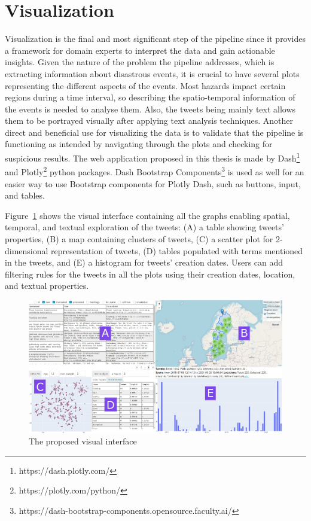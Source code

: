 \section{Visualization} 

Visualization is the final and most significant step of the pipeline since it provides a framework
for domain experts to interpret the data and gain actionable insights. Given the nature of the
problem the pipeline addresses, which is extracting information about disastrous events, it is
crucial to have several plots representing the different aspects of the events. Most hazards impact
certain regions during a time interval, so describing the spatio-temporal information of the events
is needed to analyse them. Also, the tweets being mainly text allows them to be portrayed visually
after applying text analysis techniques. Another direct and beneficial use for visualizing the data
is to validate that the pipeline is functioning as intended by navigating through the plots and
checking for suspicious results. The web application proposed in this thesis is made by
Dash\footnote{https://dash.plotly.com/} and Plotly\footnote{https://plotly.com/python/} python
packages. Dash Bootstrap
Components\footnote{https://dash-bootstrap-components.opensource.faculty.ai/} is used as well for an
easier way to use Bootstrap components for Plotly Dash, such as buttons, input, and tables.

Figure~\ref{fig:visual_interface} shows the visual interface containing all the graphs enabling
spatial, temporal, and textual exploration of the tweets: (A) a table showing tweets' properties,
(B) a map containing clusters of tweets, (C) a scatter plot for 2-dimensional representation of
tweets, (D) tables populated with terms mentioned in the tweets, and (E) a histogram for tweets'
creation dates. Users can add filtering rules for the tweets in all the plots using their creation
dates, location, and textual properties.

\begin{figure}[H]
\begin{center}
  \includegraphics[width=\columnwidth]{./images/visual_interface.png}
\end{center}
\caption{The proposed visual interface}
\label{fig:visual_interface}
\end{figure}


